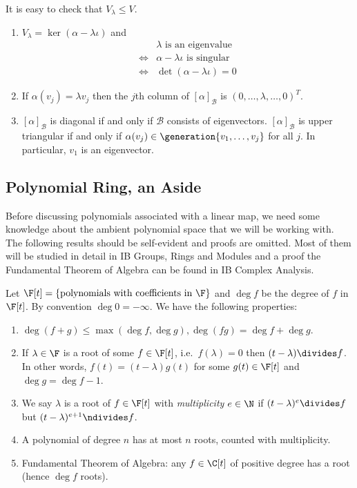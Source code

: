 \documentclass[a4paper]{article}
\newcommand*{\spans}{\generation}
\newcommand*{\basis}{\mathcal}
\theoremstyle{definition}
\begin{document}
\begin{remark}
  It is easy to check that \(V_\lambda \leq V\).
\end{remark}

\begin{remark}\leavevmode
  \begin{enumerate}
  \item \(V_\lambda = \ker(\alpha - \lambda \iota)\) and
    \begin{align*}
      & \lambda \text{ is an eigenvalue} \\
      \Leftrightarrow & \alpha - \lambda \iota \text{ is singular} \\
      \Leftrightarrow & \det (\alpha - \lambda \iota) = 0
    \end{align*}
  \item If \(\alpha(v_j) = \lambda v_j\) then the \(j\)th column of \([\alpha]_{\basis B}\) is \((0, \dots, \lambda, \dots, 0)^T\).
  \item \([\alpha]_{\basis B}\) is diagonal if and only if \(\basis B\) consists of eigenvectors. \([\alpha]_{\basis B}\) is upper triangular if and only if \(\alpha(v_j) \in \spans{v_1, \dots, v_j}\) for all \(j\). In particular, \(v_1\) is an eigenvector.
  \end{enumerate}
\end{remark}

\subsection{Polynomial Ring, an Aside}

Before discussing polynomials associated with a linear map, we need some knowledge about the ambient polynomial space that we will be working with. The following results should be self-evident and proofs are omitted. Most of them will be studied in detail in IB Groups, Rings and Modules and a proof the Fundamental Theorem of Algebra can be found in IB Complex Analysis.

Let \(\F[t] = \{\text{polynomials with coefficients in } \F\}\) and \(\deg f\) be the degree of \(f\) in \(\F[t]\). By convention \(\deg 0 = -\infty\). We have the following properties:
\begin{enumerate}
\item \(\deg (f + g) \leq \max(\deg f, \deg g), \deg(f g) = \deg f + \deg g\).
\item If \(\lambda \in \F\) is a root of some \(f \in \F[t]\), i.e.\ \(f(\lambda) = 0\) then \((t - \lambda) \divides f\). In other words, \(f(t) = (t - \lambda) g(t)\) for some \(g(t) \in \F[t]\) and \(\deg g = \deg f - 1\).
\item We say \(\lambda\) is a root of \(f \in \F[t]\) with \emph{multiplicity} \(e \in \N\) if \((t - \lambda)^e \divides f\) but \((t - \lambda)^{e + 1} \ndivides f\).
\item A polynomial of degree \(n\) has at most \(n\) roots, counted with multiplicity.
\item Fundamental Theorem of Algebra: any \(f \in \C[t]\) of positive degree has a root (hence \(\deg f\) roots).
\end{enumerate}
\end{document}
